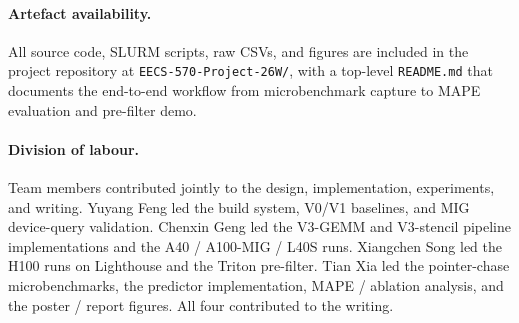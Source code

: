 \documentclass[10pt,twocolumn]{article}
\begin{document}
\paragraph{Artefact availability.}
All source code, SLURM scripts, raw CSVs, and figures are included
in the project repository at
\texttt{EECS-570-Project-26W/}, with a top-level \texttt{README.md}
that documents the end-to-end workflow from microbenchmark capture
to MAPE evaluation and pre-filter demo.

\paragraph{Division of labour.}
Team members contributed jointly to the design, implementation,
experiments, and writing.  Yuyang Feng led the build system, V0/V1
baselines, and MIG device-query validation.  Chenxin Geng led the
V3-GEMM and V3-stencil pipeline implementations and the A40 /
A100-MIG / L40S runs.  Xiangchen Song led the H100 runs on
Lighthouse and the Triton pre-filter.  Tian Xia led the
pointer-chase microbenchmarks, the predictor implementation, MAPE /
ablation analysis, and the poster / report figures.  All four
contributed to the writing.



\end{document}
